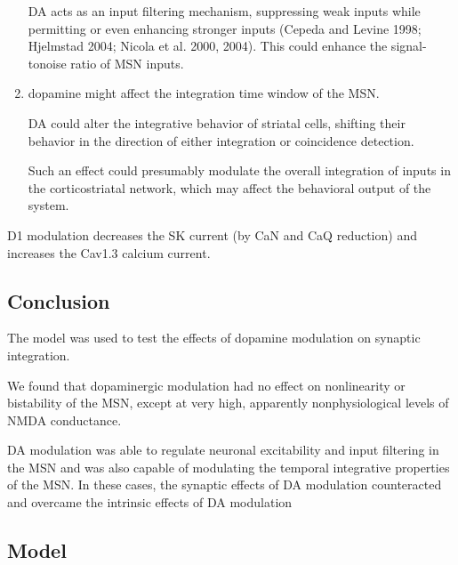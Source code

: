 \begin{enumerate}
DA acts as an input filtering mechanism,
suppressing weak inputs while permitting or even enhancing
stronger inputs (Cepeda and Levine 1998; Hjelmstad 2004;
Nicola et al. 2000, 2004). This could enhance the signal-tonoise
ratio of MSN inputs.

  \item dopamine might affect the integration time
window of the MSN.

DA could alter the integrative behavior of striatal cells, shifting their
behavior in the direction of either integration or coincidence detection.

Such an effect could presumably modulate the overall integration of inputs in
the corticostriatal network, which may affect the behavioral output of the
system.
\end{enumerate}

D1 modulation decreases the SK current (by CaN and CaQ reduction)
and increases the Cav1.3 calcium current. 

\subsection{Conclusion}

The model was used to test the effects of dopamine modulation on synaptic
integration.

We found that dopaminergic modulation had no effect on nonlinearity or
bistability of the MSN, except at very high, apparently nonphysiological levels
of NMDA conductance.

DA modulation was able to regulate neuronal excitability and input filtering in
the MSN and was also capable of modulating the temporal integrative properties
of the MSN. In these cases, the synaptic effects of DA modulation counteracted
and overcame the intrinsic effects of DA modulation

\subsection{Model}

